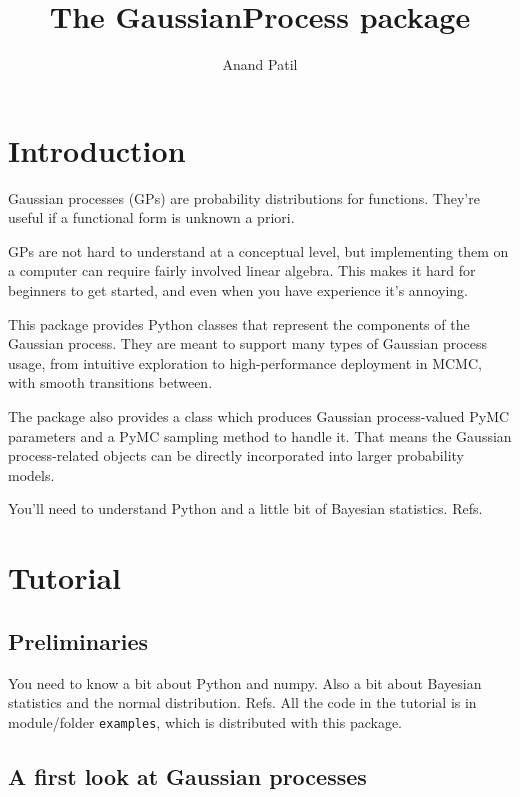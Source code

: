\documentclass{report}
\begin{document}
\title{The GaussianProcess package}
\author{Anand Patil}
\maketitle
\tableofcontents

\chapter{Introduction}\label{cha:introduction} %

Gaussian processes (GPs) are probability distributions for functions. They're useful if a functional form is unknown a priori.

GPs are not hard to understand at a conceptual level, but implementing them on a computer can require fairly involved linear algebra. This makes it hard for beginners to get started, and even when you have experience it's annoying.

This package provides Python classes that represent the components of the Gaussian process. They are meant to support many types of Gaussian process usage, from intuitive exploration to high-performance deployment in MCMC, with smooth transitions between.

The package also provides a class which produces Gaussian process-valued PyMC parameters and a PyMC sampling method to handle it. That means the Gaussian process-related objects can be directly incorporated into larger probability models.

You'll need to understand Python and a little bit of Bayesian statistics. Refs.


\chapter{Tutorial}\label{cha:tutorial} 

\section{Preliminaries}\label{sec:preliminaries}
You need to know a bit about Python and numpy. Also a bit about Bayesian statistics and the normal distribution. Refs. All the code in the tutorial is in module/folder \texttt{examples}, which is distributed with this package.

\section{A first look at Gaussian processes}\label{sec:first_look} %
\end{document}
